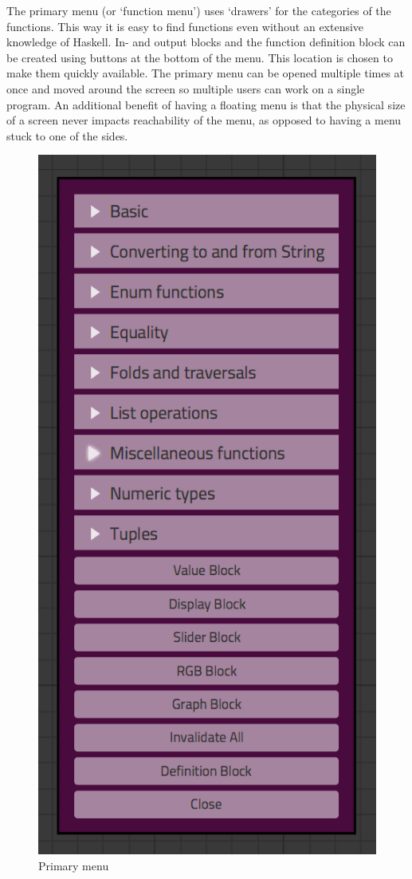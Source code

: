 The primary menu (or `function menu') uses `drawers' for the categories of the functions.  
This way it is easy to find functions even without an extensive knowledge of Haskell.
In- and output blocks and the function definition block can be created using buttons at the bottom of the menu.
This location is chosen to make them quickly available.
The primary menu can be opened multiple times at once and moved around the screen so multiple users can work on a single program. An additional benefit of having a floating menu is that the physical size of a screen never impacts reachability of the menu, as opposed to having a menu stuck to one of the sides.

\begin{figure}[p]
	\centering
	\includegraphics[scale=0.5]{Images/menu}
	\caption{Primary menu}
	\label{fig:ui-menu}
\end{figure}

